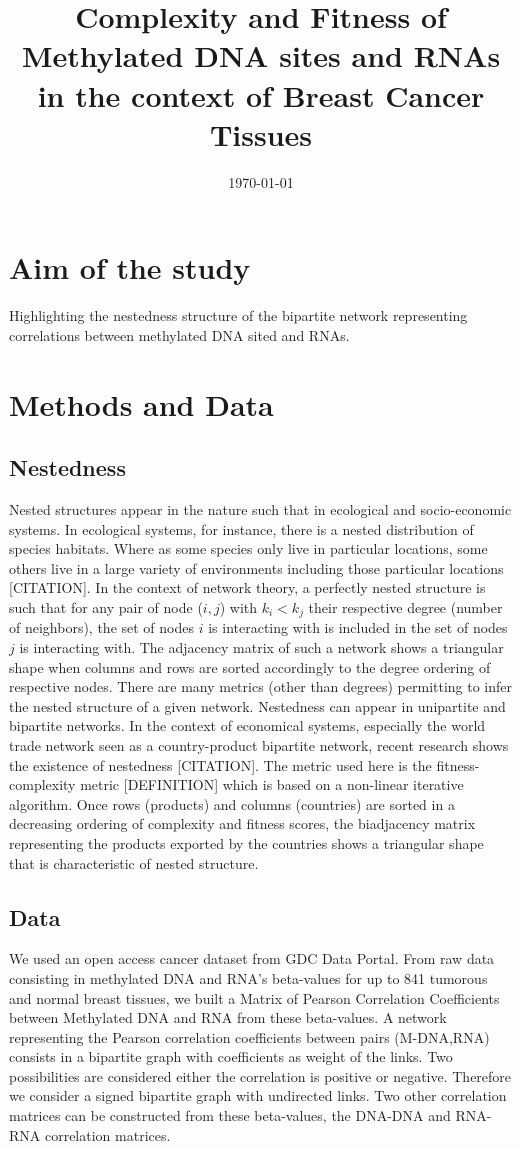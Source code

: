 \documentclass[10pt,a4paper]{article}
\title{Complexity and Fitness of Methylated DNA sites and RNAs in the context of Breast Cancer Tissues}
\date{\today}
\begin{document}
\maketitle
\section{Aim of the study}
Highlighting the nestedness structure of the bipartite network representing correlations between methylated DNA sited and RNAs.
\section{Methods and Data}
\subsection{Nestedness}
Nested structures appear in the nature such that in ecological and socio-economic systems. In ecological systems, for instance, there is a nested distribution of species habitats. Where as some species only live in particular locations, some others live in a large variety of environments including those particular locations [CITATION]. In the context of network theory, a perfectly nested structure is such that for any pair of node ($i,j$) with $k_{i} < k_{j}$ their respective degree (number of neighbors), the set of nodes $i$ is interacting with is included in the set of nodes $j$ is interacting with. The adjacency matrix of such a network shows a triangular shape when columns and rows are sorted accordingly to the degree ordering of respective nodes. There are many metrics (other than degrees) permitting to infer the nested structure of a given network. Nestedness can appear in unipartite and bipartite networks. In the context of economical systems, especially the world trade network seen as a country-product bipartite network, recent research shows the existence of nestedness [CITATION]. The metric used here is the fitness-complexity metric [DEFINITION] which is based on a non-linear iterative algorithm. Once rows (products) and columns (countries) are sorted in a decreasing ordering of complexity and fitness scores, the biadjacency matrix representing the products exported by the countries shows a triangular shape that is characteristic of nested structure.
\subsection{Data}
We used an open access cancer dataset from GDC Data Portal. From raw data consisting in methylated DNA and RNA's beta-values for up to 841 tumorous and normal breast tissues, we built a Matrix of Pearson Correlation Coefficients between Methylated DNA and RNA from these beta-values. A network representing the Pearson correlation coefficients between pairs (M-DNA,RNA) consists in a bipartite graph with coefficients as weight of the links. Two possibilities are considered either the correlation is positive or negative. Therefore we consider a signed bipartite graph with undirected links. Two other correlation matrices can be constructed from these beta-values, the DNA-DNA and RNA-RNA correlation matrices.
\end{document}
